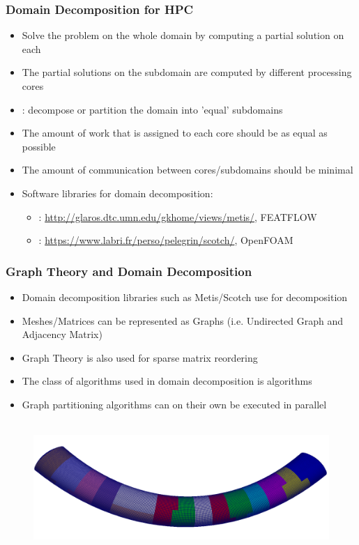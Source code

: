 \begin{frame}
\frametitle{Domain Decomposition for HPC}
\begin{itemize}
\item Solve the problem on the whole domain by computing a partial solution on each 
\item The partial solutions on the subdomain are computed by different processing cores
\item {}: decompose or partition the domain into 'equal' subdomains
\item The amount of work that is assigned to each core should be as equal as possible
\item The amount of communication between cores/subdomains should be minimal
\item Software libraries for domain decomposition: 
\begin{itemize}
\item {}: \url{http://glaros.dtc.umn.edu/gkhome/views/metis/}, FEATFLOW
\item {}: \url{https://www.labri.fr/perso/pelegrin/scotch/}, OpenFOAM
\end{itemize}
\end{itemize}
\end{frame}

\begin{frame}
\frametitle{Graph Theory and Domain Decomposition}
\begin{itemize}
\item Domain decomposition libraries such as Metis/Scotch use  for decomposition
\item Meshes/Matrices can be represented as Graphs (i.e. Undirected Graph and Adjacency Matrix)
\item Graph Theory is also used for sparse matrix reordering 
\item The class of algorithms used in domain decomposition is  algorithms
\item Graph partitioning algorithms can on their own be executed in parallel
\end{itemize}
\begin{figure}[h!]
\centering
\includegraphics[height=5cm]{screenshots/domain-decomposition.png}
\label{fig:domains}
\end{figure}
\end{frame}


